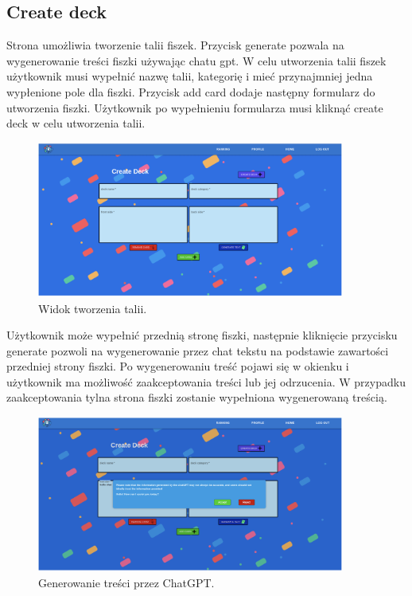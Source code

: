 \subsection{Create deck}
Strona umożliwia tworzenie talii fiszek. Przycisk generate pozwala na wygenerowanie treści fiszki używając chatu gpt. W celu utworzenia talii fiszek użytkownik musi wypełnić nazwę talii, kategorię i mieć przynajmniej jedna wypłenione pole dla fiszki. Przycisk add card dodaje następny formularz do utworzenia fiszki. Użytkownik po wypełnieniu formularza musi kliknąć create deck w celu utworzenia talii.


\begin{figure}[H]
    \centering
    \includegraphics[width=0.9\textwidth]{chapters/chapter_10/images_web/web_create_deck}
    \caption{Widok tworzenia talii.}
    \label{img:web_create_deck}
\end{figure}


Użytkownik może wypełnić przednią stronę fiszki, następnie kliknięcie przycisku generate pozwoli na wygenerowanie przez chat tekstu na podstawie zawartości przedniej strony fiszki. Po wygenerowaniu treść pojawi się w okienku i użytkownik ma możliwość zaakceptowania treści lub jej odrzucenia. W przypadku zaakceptowania tylna strona fiszki zostanie wypełniona wygenerowaną treścią.


\begin{figure}[H]
    \centering
    \includegraphics[width=0.9\textwidth]{chapters/chapter_10/images_web/web_chat}
    \caption{Generowanie treści przez ChatGPT.}
    \label{img:web_chat}
\end{figure}


